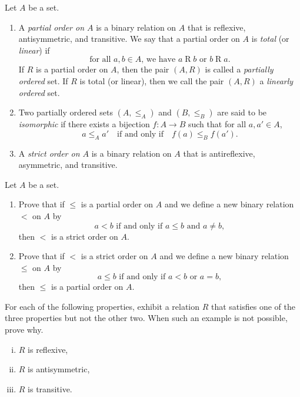 \begin{definition}
  \label{def:posets}
  Let $A$ be a set.
  \begin{enumerate}
  \item
    A \emph{partial order on $A$}  is a binary relation on $A$ that is reflexive, antisymmetric, and transitive.
    We say that a partial order on $A$ is \emph{total} (or \emph{linear}) if
    \[
      \text{for all $a, b\in A$, we have  $a\mathrel{R}b$ or $b\mathrel{R}a$.}
    \]
    If $R$ is a partial order on $A$, then the pair $(A,R)$ is called a \emph{partially ordered} set.
    If $R$ is total (or linear), then we call the pair $(A,R)$ a \emph{linearly ordered}  set.

  \item
    Two partially ordered sets $(A, \le_A)$ and $(B,\le_B)$ are said to be \emph{isomorphic} if there exists a bijection $f:A\to B$ such that for all $a, a'\in A$,
    \[
      a\le_A a'
      \quad\text{if and only if}\quad
      f(a)\le_B f(a').
    \]

  \item
    A \emph{strict order on $A$}  is a binary relation on $A$ that is antireflexive, asymmetric, and transitive.
  \end{enumerate}
\end{definition}

\begin{exercise}
  Let $A$ be a set.

  \begin{enumerate}
  \item
    Prove that if $\leq$ is a partial order on  $A$ and we define a new binary relation $<$ on $A$ by
    \[
      \text{$a<b$ if and only if  $a\leq b$ and $a\neq b$},
    \]
    then $<$ is a strict order on $A$.
  \item
    Prove that if $<$ is a strict order on  $A$ and we define a new binary relation $\le$ on $A$ by
    \[
      \text{$a\le b$ if and only if  $a < b$ or $a = b$},
    \]
    then $\le$ is a  partial order on $A$.
  \end{enumerate}

\end{exercise}

\begin{exercise}
  For each of the following properties, exhibit a relation $R$ that satisfies one of the three properties but not the other two.
  When such an example is not possible, prove why.
  \begin{enumerate}[(i)]
  \item
    $R$ is reflexive,
  \item
    $R$ is antisymmetric,
  \item
    $R$ is transitive.

  \end{enumerate}
\end{exercise}

